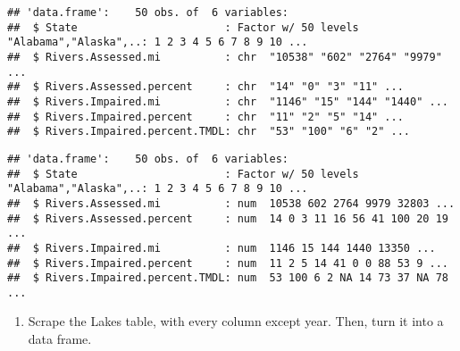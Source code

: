 \documentclass[]{article}
\newenvironment{Shaded}{\begin{snugshade}}{\end{snugshade}}
\newcommand{\KeywordTok}[1]{\textcolor[rgb]{0.13,0.29,0.53}{\textbf{#1}}}
\newcommand{\NormalTok}[1]{#1}
\newcommand{\OperatorTok}[1]{\textcolor[rgb]{0.81,0.36,0.00}{\textbf{#1}}}
\newcommand{\StringTok}[1]{\textcolor[rgb]{0.31,0.60,0.02}{#1}}
\providecommand{\tightlist}{%
  \setlength{\itemsep}{0pt}\setlength{\parskip}{0pt}}
\begin{document}
\begin{verbatim}
## 'data.frame':    50 obs. of  6 variables:
##  $ State                       : Factor w/ 50 levels "Alabama","Alaska",..: 1 2 3 4 5 6 7 8 9 10 ...
##  $ Rivers.Assessed.mi          : chr  "10538" "602" "2764" "9979" ...
##  $ Rivers.Assessed.percent     : chr  "14" "0" "3" "11" ...
##  $ Rivers.Impaired.mi          : chr  "1146" "15" "144" "1440" ...
##  $ Rivers.Impaired.percent     : chr  "11" "2" "5" "14" ...
##  $ Rivers.Impaired.percent.TMDL: chr  "53" "100" "6" "2" ...
\end{verbatim}

\begin{Shaded}
\end{Shaded}

\begin{verbatim}
## 'data.frame':    50 obs. of  6 variables:
##  $ State                       : Factor w/ 50 levels "Alabama","Alaska",..: 1 2 3 4 5 6 7 8 9 10 ...
##  $ Rivers.Assessed.mi          : num  10538 602 2764 9979 32803 ...
##  $ Rivers.Assessed.percent     : num  14 0 3 11 16 56 41 100 20 19 ...
##  $ Rivers.Impaired.mi          : num  1146 15 144 1440 13350 ...
##  $ Rivers.Impaired.percent     : num  11 2 5 14 41 0 0 88 53 9 ...
##  $ Rivers.Impaired.percent.TMDL: num  53 100 6 2 NA 14 73 37 NA 78 ...
\end{verbatim}

\begin{enumerate}
\def\labelenumi{\arabic{enumi}.}
\setcounter{enumi}{5}
\tightlist
\item
  Scrape the Lakes table, with every column except year. Then, turn it
  into a data frame.
\end{enumerate}
\end{document}
